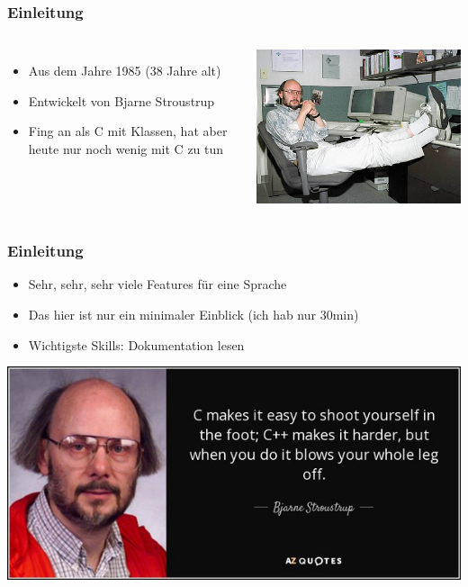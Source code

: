 \documentclass[plain]{beamer}
\title{\huge \cpp{}}
\author{Max Schik}
\begin{document}
\begin{frame}
  \titlepage
\end{frame}

\begin{frame}
  \frametitle{Einleitung}
  \begin{columns}[onlytextwidth,T]
    \column{\dimexpr\linewidth-50mm-5mm}
    \begin{itemize}
      \item Aus dem Jahre 1985 (38 Jahre alt)
      \item Entwickelt von Bjarne Stroustrup
      \item Fing an als C mit Klassen, hat aber heute nur noch wenig mit C zu tun
    \end{itemize}
    \column{50mm}
    \includegraphics[width=\textwidth]{imgs/BjarneStroustrup.jpg}
  \end{columns}
\end{frame}

\begin{frame}
  \frametitle{Einleitung}
  \begin{itemize}
    \item Sehr, sehr, sehr viele Features für eine Sprache
    \item Das hier ist nur ein minimaler Einblick (ich hab nur 30min)
    \item Wichtigste Skills: Dokumentation lesen
  \end{itemize}
  \center \includegraphics[height=0.4\textheight]{imgs/no-leg.jpeg}
\end{frame}
\end{document}
